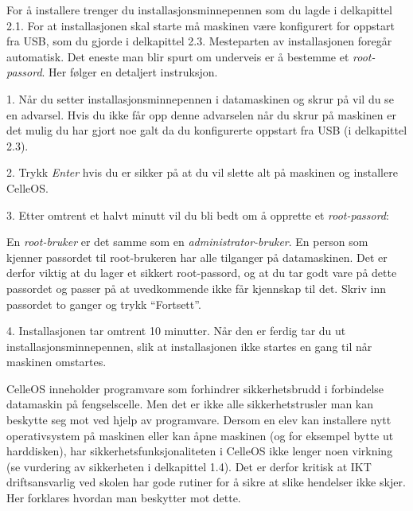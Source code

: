 For \aa{} installere trenger du installasjons\-minnepennen som du lagde i delkapittel 2.1. For at installasjonen skal starte m\aa{} maskinen v\ae re konfigurert for oppstart fra USB, som du gjorde i delkapittel 2.3. Mesteparten av installasjonen foreg\aa r automatisk. Det eneste man blir spurt om underveis er \aa{} bestemme et {\it root-passord}. Her f\o lger en detaljert instruksjon.
\item{1.} N\aa r du setter installasjonsminnepennen i datamaskinen og skrur p\aa{} vil du se en advarsel. Hvis du ikke f\aa r opp denne advarselen n\aa r du skrur p\aa{} maskinen er det mulig du har gjort noe galt da du konfigurerte oppstart fra USB (i delkapittel 2.3).
\vskip 1pc
\vskip 1pc
\item{2.} Trykk {\it Enter} hvis du er sikker p\aa{} at du vil slette alt p\aa{} maskinen og installere CelleOS.
\item{3.} Etter omtrent et halvt minutt vil du bli bedt om \aa{} opprette et {\it root-passord}:
\vskip 1pc
\vskip 1pc
\item{} En {\it root-bruker} er det samme som en {\it administrator-bruker}. En person som kjenner passordet til root-brukeren har alle tilganger p\aa{} datamaskinen. Det er derfor viktig at du lager et sikkert root-passord, og at du tar godt vare p\aa{} dette passordet og passer p\aa{} at uvedkommende ikke f\aa r kjennskap til det. Skriv inn passordet to ganger og trykk ``Fortsett''.
\item{4.} Installasjonen tar omtrent 10 minutter. N\aa r den er ferdig tar du ut installasjonsminnepennen, slik at installasjonen ikke startes en gang til n\aa r maskinen omstartes.

\vfill\eject
\topglue 1pc

CelleOS inneholder programvare som forhindrer sikkerhetsbrudd i forbindelse datamaskin p\aa{} fengselscelle. Men det er ikke alle sikkerhetstrusler man kan beskytte seg mot ved hjelp av programvare. Dersom en elev kan installere nytt operativsystem p\aa{} maskinen eller kan \aa pne maskinen (og for eksempel bytte ut harddisken), har sikkerhetsfunksjonaliteten i CelleOS ikke lenger noen virkning (se vurdering av sikkerheten i delkapittel 1.4). Det er derfor kritisk at IKT driftsansvarlig ved skolen har gode rutiner for \aa{} sikre at slike hendelser ikke skjer. Her forklares hvordan man beskytter mot dette.

